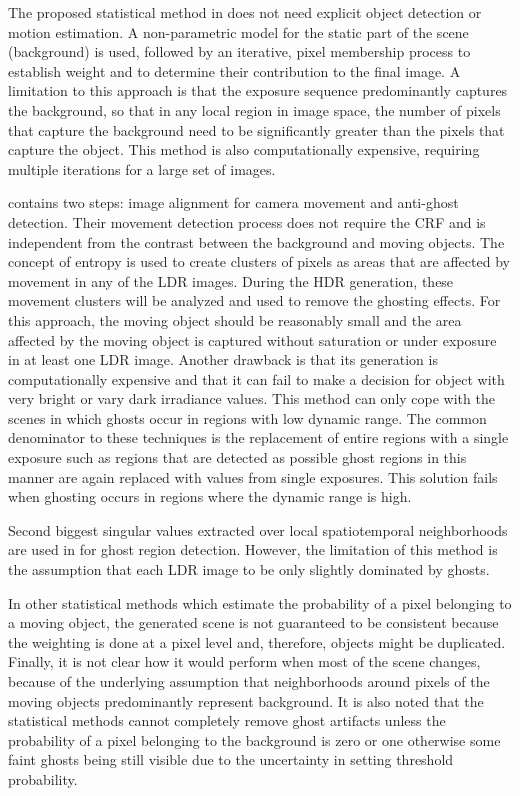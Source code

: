 \documentclass[preprint,12pt,3p]{elsarticle}
\begin{document}
The  proposed statistical method in \cite{13} does not need explicit object detection or motion estimation. A non-parametric model for the static part of the scene (background) is used, followed by an iterative, pixel membership process to establish weight and to determine their contribution to the final image. A limitation to this approach is that the exposure sequence predominantly captures the background, so that in any local region in image space, the number of pixels that capture the background need to be significantly greater than the pixels that capture the object. This method is also computationally expensive, requiring multiple iterations for a large  set of images.

\cite{3} contains two steps: image alignment for camera movement and anti-ghost detection. Their movement detection process does not require the CRF and is independent from the contrast between the background and moving objects.  The concept of entropy is used to create clusters of pixels as areas that are affected by movement in any of the LDR images. During the HDR generation, these movement clusters will be analyzed and used to remove the ghosting effects. For this approach, the moving object should be reasonably small and the area affected by the moving object is captured without saturation or under exposure in at least one LDR image. Another drawback is that its generation is computationally expensive and that it can fail to make a decision for object with very bright or vary dark irradiance values. This method can only cope with the scenes in which ghosts occur in regions with low dynamic range. The common denominator to these techniques is the replacement of entire regions with a single exposure such as regions that are detected as possible ghost regions in this manner are again replaced with values from single exposures. This solution fails when ghosting occurs in regions where the dynamic range is high.

Second biggest singular values extracted over local spatiotemporal neighborhoods are used in \cite{srikanthasvd} for ghost region detection. However, the limitation of this method is the assumption that each LDR image to be only slightly dominated by ghosts.

In other statistical methods which estimate the probability of a pixel belonging to a moving object, the generated scene is not guaranteed to be consistent because the weighting is done at a pixel level and, therefore, objects might be duplicated. Finally, it is not clear how it would perform when most of the scene changes, because of the underlying assumption that neighborhoods around pixels of the moving objects predominantly represent background. It is also noted that the statistical methods cannot completely remove ghost artifacts unless the probability of a pixel belonging to the background is zero or one otherwise some faint ghosts being still visible due to the uncertainty in setting threshold probability.
\end{document}
